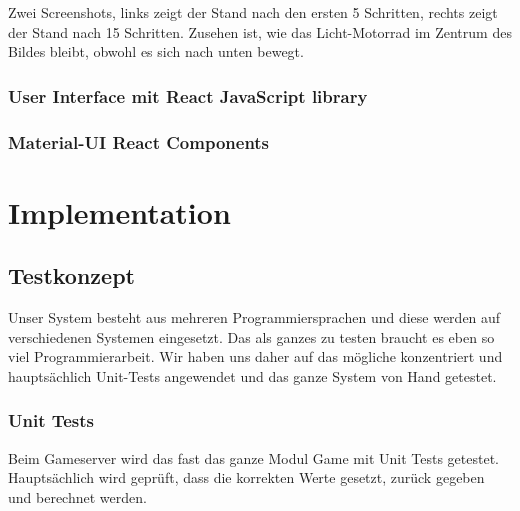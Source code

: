\documentclass[11pt,ngerman]{article}
\begin{document}
	Zwei Screenshots, links zeigt der Stand nach den ersten 5 Schritten, rechts zeigt der Stand nach 15 Schritten. Zusehen ist, wie das Licht-Motorrad im Zentrum des Bildes bleibt, obwohl es sich nach unten bewegt.

    \subsubsection{User Interface mit React JavaScript library}

    \subsubsection{Material-UI React Components}




    \section{Implementation}

    \subsection{Testkonzept}
    Unser System besteht aus mehreren Programmiersprachen und diese werden auf verschiedenen Systemen eingesetzt. Das als ganzes zu testen braucht es eben so viel Programmierarbeit. Wir haben uns daher auf das mögliche konzentriert und hauptsächlich Unit-Tests angewendet und das ganze System von Hand getestet.

    \subsubsection{Unit Tests}
	Beim Gameserver wird das fast das ganze Modul Game mit Unit Tests getestet. Hauptsächlich wird geprüft, dass die korrekten Werte gesetzt, zurück gegeben und berechnet werden.
\end{document}
